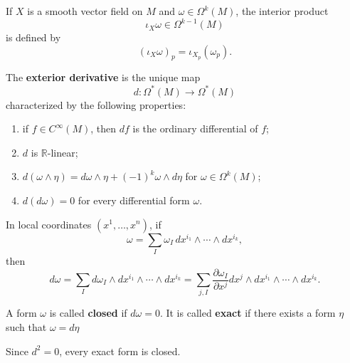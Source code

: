 \documentclass[12pt, oneside]{book}
\begin{document}
\begin{definition}
    If $X$ is a smooth vector field on $M$ and $\omega\in\Omega^k(M)$, the interior product
    \[
        \iota_X\omega\in\Omega^{k-1}(M)
    \]
    is defined by
    \[
        (\iota_X\omega)_p=\iota_{X_p}(\omega_p).
    \]
\end{definition}
\begin{definition}
    The \textbf{exterior derivative} is the unique map
    \begin{equation*}
        d:\Omega^*(M)\rightarrow \Omega^{*}(M)
    \end{equation*}
    characterized by the following properties:
    \begin{enumerate}[label=(\arabic*)]
        \item if $f\in C^\infty(M)$, then $df$ is the ordinary differential of $f$;
        \item $d$ is $\mathbb{R}$-linear;
        \item $d(\omega\wedge\eta)=d\omega\wedge\eta+(-1)^k\omega\wedge d\eta$ for $\omega\in\Omega^k(M)$;
        \item $d(d\omega)=0$ for every differential form $\omega$.
    \end{enumerate}
\end{definition}

\begin{proposition}
    In local coordinates $(x^1,\ldots,x^n)$, if
    \[
        \omega
        =
        \sum_I \omega_I\,dx^{i_1}\wedge\cdots\wedge dx^{i_k},
    \]
    then
    \[
        d\omega
        =
        \sum_I d\omega_I\wedge dx^{i_1}\wedge\cdots\wedge dx^{i_k}
        =
        \sum_{j,I}
        \frac{\partial \omega_I}{\partial x^j}
        dx^j\wedge dx^{i_1}\wedge\cdots\wedge dx^{i_k}.
    \]
\end{proposition}




\begin{definition}
    A form $\omega$ is called \textbf{closed} if $d\omega=0$. It is called \textbf{exact} if there exists a form $\eta$ such that $\omega=d\eta$
    \begin{remark}
        Since $d^2=0$, every exact form is closed.
    \end{remark}
\end{definition}
\end{document}
